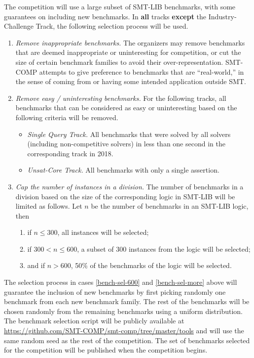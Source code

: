 \documentclass[12pt]{article}
\newcommand{\maintrack}{Single Query Track\xspace}
\newcommand{\ucoretrack}{Unsat-Core Track\xspace}
\newcommand{\challtrack}{Industry-Challenge Track\xspace}
\begin{document}
 \label{benchmark-selection}
The competition will use a large subset of SMT-LIB benchmarks, with some
guarantees on including new benchmarks.  In \textbf{all} tracks \textbf{except}
the \challtrack, the following selection process will be used.
\begin{enumerate}
\item \emph{Remove inappropriate benchmarks.} The
  organizers may remove benchmarks that are deemed inappropriate or
  uninteresting for competition, or cut the size of certain benchmark
  families to avoid their over-representation.  SMT-COMP attempts to
  give preference to benchmarks that are ``real-world,'' in the sense
  of coming from or having some intended application outside SMT.
\item \emph{Remove easy / uninteresting benchmarks.}
  For the following tracks, all benchmarks that can be
  considered as easy or uninteresting based on the following criteria
  will be removed.
  \begin{itemize}
    \item \emph{\maintrack.} All benchmarks that were solved by all
      solvers (including non-competitive solvers) in less than one second in
      the corresponding track in 2018.
    \item \emph{\ucoretrack.} All benchmarks with only a single assertion.
  \end{itemize}
\item \emph{Cap the number of instances in a division.}
  The number of benchmarks in a division based on the size of the
  corresponding logic in SMT-LIB will be limited as follows.
  Let $n$ be the number of benchmarks in an SMT-LIB logic, then
  \begin{enumerate}
  \vspace{-1ex}
    \item \label{bench-sel-300} if $n \le 300$, all instances will be selected;
  \item \label{bench-sel-600} if $300 < n \leq 600$, a subset of 300 instances
    from the logic will be selected;
  \item \label{bench-sel-more} and if $n > 600$,
    50\% of the benchmarks of the logic will be selected.
  \end{enumerate}
\end{enumerate}
%
The selection process in cases \ref{bench-sel-600} and \ref{bench-sel-more}
above will guarantee the inclusion of new benchmarks by first picking randomly
one benchmark from each new benchmark family.  The rest of the benchmarks will
be chosen randomly from the remaining benchmarks using a uniform distribution.
%
The benchmark selection script will be publicly available at
\url{https://github.com/SMT-COMP/smt-comp/tree/master/tools} and
will use the same random seed as the rest of the competition.  The set of
benchmarks selected for the competition will be published when the competition
begins.
\end{document}
